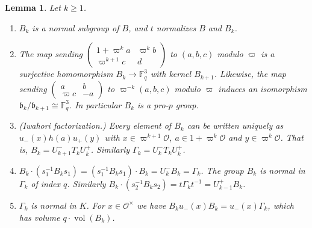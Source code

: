 \documentclass[12pt,letterpaper]{amsart}
\numberwithin{equation}{section}
\newtheorem{lemma}[theorem]{Lemma}
\theoremstyle{definition}
\theoremstyle{remark}
\DeclareMathOperator{\vol}{vol}
\newcommand{\cO}{\mathcal{O}}
\newcommand{\fb}{\mathfrak{b}}
\newcommand{\Fq}{\mathbb{F}_q}
\newcommand{\mat}[4]{\begin{pmatrix} #1 & #2\\ #3 & #4\end{pmatrix}}
\begin{document}
\begin{lemma}
\label{lemma:subgroups}
Let $k\geq 1$.
\begin{enumerate}[leftmargin=2em,label=(\alph*)]
\item $B_k$ is a normal subgroup of $B$, and $t$ normalizes $B$ and
$B_k$.
\item The map sending $\mat{1+\varpi^ka}{\varpi^kb}{\varpi^{k+1}c}{d}$
to $(a,b,c)$ modulo $\varpi$ is a surjective homomorphism
$B_k\to\Fq^3$ with kernel $B_{k+1}$. Likewise, the map sending
$\mat ab{\varpi c}{-a}$ to $\varpi^{-k}(a,b,c)$ modulo $\varpi$
induces an isomorphism $\fb_k/\fb_{k+1}\cong\Fq^3$. In particular
$B_k$ is a pro-$p$ group.
\item (Iwahori factorization.) Every element of $B_k$ can be written
uniquely as $u_-(x)h(a)u_+(y)$ with $x\in\varpi^{k+1}\cO$,
$a\in 1+\varpi^k\cO$ and $y\in\varpi^k\cO$. That is,
$B_k=U^-_{k+1}T_kU^+_k$. Similarly $\Gamma_k=U^-_kT_kU^+_k$.
\item $B_k\cdot(s_1^{-1}B_ks_1)=(s_1^{-1}B_ks_1)\cdot B_k
=U_k^-B_k=\Gamma_k$. The group $B_k$ is normal in $\Gamma_k$ of index
$q$. Similarly $B_k\cdot(s_2^{-1}B_ks_2)=t\Gamma_kt^{-1}=U^+_{k-1}B_k$.
\item $\Gamma_k$ is normal in $K$. For $x\in\cO^\times$ we have
$B_ku_-(x)B_k=u_-(x)\Gamma_k$, which has volume $q\cdot\vol(B_k)$.
\end{enumerate}
\end{lemma}
\end{document}
